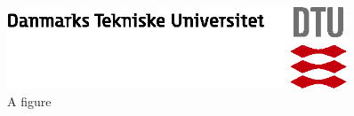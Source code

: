 \documentclass[final, pdftex, 11pt, a4paper]{report} %
\begin{document}
\begin{figure}
  \centering
  \includegraphics[width=0.9\textwidth]{logo.eps}
  \caption{A figure}\label{fig:testfil}
\end{figure}
\end{document}
